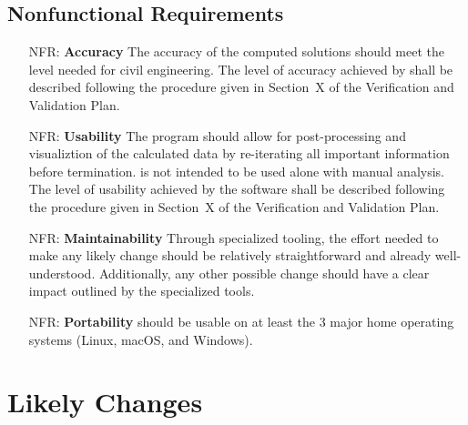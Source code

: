 \documentclass[12pt]{article}
\newcounter{nfrnum} %
\begin{document}
\subsection{Nonfunctional Requirements}

\noindent\begin{itemize}

    \item[NFR\refstepcounter{nfrnum}\thenfrnum \label{NFR_Accuracy}:]
        \textbf{Accuracy} The accuracy of the computed solutions should meet the
        level needed for civil engineering.  The level of accuracy achieved by
        \progname{} shall be described following the procedure given in
        Section~X of the Verification and Validation
        Plan.

    \item[NFR\refstepcounter{nfrnum}\thenfrnum \label{NFR_Usability}:]
        \textbf{Usability} The program should allow for post-processing and
        visualiztion of the calculated data by re-iterating all important
        information before termination. \progname{} is not intended to be used
        alone with manual analysis. The level of usability achieved by the
        software shall be described following the procedure given in
        Section~X of the Verification and Validation
        Plan.

    \item[NFR\refstepcounter{nfrnum}\thenfrnum \label{NFR_Maintainability}:]
        \textbf{Maintainability} Through specialized tooling, the effort needed
        to make any likely change should be relatively straightforward and
        already well-understood. Additionally, any other possible change should
        have a clear impact outlined by the specialized tools.

    \item[NFR\refstepcounter{nfrnum}\thenfrnum \label{NFR_Portability}:]
        \textbf{Portability} \progname{} should be usable on at least the 3
        major home operating systems (Linux, macOS, and Windows).

\end{itemize}



\section{Likely Changes}
\end{document}
